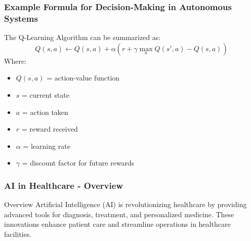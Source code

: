 \documentclass[aspectratio=169]{beamer}
\begin{document}
\begin{frame}[fragile]
    \frametitle{Example Formula for Decision-Making in Autonomous Systems}
    The Q-Learning Algorithm can be summarized as:
    \begin{equation}
        Q(s, a) \leftarrow Q(s, a) + \alpha \left( r + \gamma \max_{a} Q(s', a) - Q(s, a) \right)
    \end{equation}
    Where:
    \begin{itemize}
        \item \( Q(s, a) \) = action-value function
        \item \( s \) = current state
        \item \( a \) = action taken
        \item \( r \) = reward received
        \item \( \alpha \) = learning rate
        \item \( \gamma \) = discount factor for future rewards
    \end{itemize}
\end{frame}

\begin{frame}[fragile]
    \frametitle{AI in Healthcare - Overview}
    \begin{block}{Overview}
        Artificial Intelligence (AI) is revolutionizing healthcare by providing advanced tools for diagnosis, treatment, and personalized medicine. These innovations enhance patient care and streamline operations in healthcare facilities.
    \end{block}
\end{frame}
\end{document}
